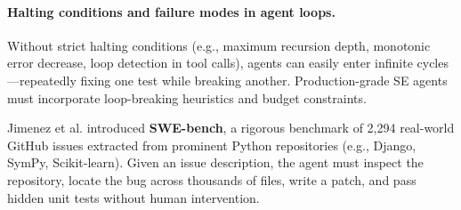 \documentclass[../../main.tex]{subfiles}
\begin{document}
\paragraph{Halting conditions and failure modes in agent loops.}
Without strict halting conditions (e.g., maximum recursion depth, monotonic error decrease, loop detection in tool calls), agents can easily enter infinite cycles---repeatedly fixing one test while breaking another. Production-grade SE agents must incorporate loop-breaking heuristics and budget constraints.


\begin{deepdive}
Jimenez et al. \citep{jimenez2024swebench} introduced \textbf{SWE-bench}, a rigorous benchmark of 2,294 real-world GitHub issues extracted from prominent Python repositories (e.g., Django, SymPy, Scikit-learn). Given an issue description, the agent must inspect the repository, locate the bug across thousands of files, write a patch, and pass hidden unit tests without human intervention.
\end{deepdive}
\end{document}
